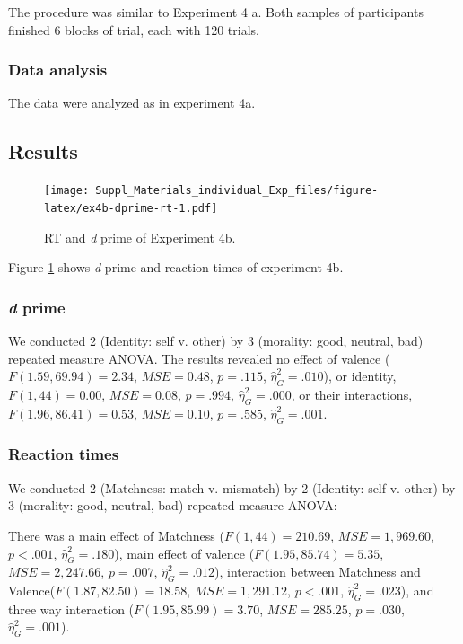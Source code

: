 \documentclass[
  english,
  man]{apa6}
\begin{document}
The procedure was similar to Experiment 4 a. Both samples of participants finished 6 blocks of trial, each with 120 trials.

\hypertarget{data-analysis-6}{%
\subsubsection{Data analysis}\label{data-analysis-6}}

The data were analyzed as in experiment 4a.

\hypertarget{results-7}{%
\subsection{Results}\label{results-7}}

\begin{figure}
\centering
\texttt{[image: Suppl\_Materials\_individual\_Exp\_files/figure-latex/ex4b-dprime-rt-1.pdf]}
\caption{\label{fig:ex4b-dprime-rt}RT and \emph{d} prime of Experiment 4b.}
\end{figure}

Figure \ref{fig:ex4b-dprime-rt} shows \emph{d} prime and reaction times of experiment 4b.

\hypertarget{d-prime-5}{%
\subsubsection{\texorpdfstring{\emph{d} prime}{d prime}}\label{d-prime-5}}

We conducted 2 (Identity: self v. other) by 3 (morality: good, neutral, bad) repeated measure ANOVA. The results revealed no effect of valence (\(F(1.59, 69.94) = 2.34\), \(\mathit{MSE} = 0.48\), \(p = .115\), \(\hat{\eta}^2_G = .010\)), or identity, \(F(1, 44) = 0.00\), \(\mathit{MSE} = 0.08\), \(p = .994\), \(\hat{\eta}^2_G = .000\), or their interactions, \(F(1.96, 86.41) = 0.53\), \(\mathit{MSE} = 0.10\), \(p = .585\), \(\hat{\eta}^2_G = .001\).

\hypertarget{reaction-times-3}{%
\subsubsection{Reaction times}\label{reaction-times-3}}

We conducted 2 (Matchness: match v. mismatch) by 2 (Identity: self v. other) by 3 (morality: good, neutral, bad) repeated measure ANOVA:

There was a main effect of Matchness (\(F(1, 44) = 210.69\), \(\mathit{MSE} = 1,969.60\), \(p < .001\), \(\hat{\eta}^2_G = .180\)), main effect of valence (\(F(1.95, 85.74) = 5.35\), \(\mathit{MSE} = 2,247.66\), \(p = .007\), \(\hat{\eta}^2_G = .012\)), interaction between Matchness and Valence(\(F(1.87, 82.50) = 18.58\), \(\mathit{MSE} = 1,291.12\), \(p < .001\), \(\hat{\eta}^2_G = .023\)), and three way interaction (\(F(1.95, 85.99) = 3.70\), \(\mathit{MSE} = 285.25\), \(p = .030\), \(\hat{\eta}^2_G = .001\)).
\end{document}
